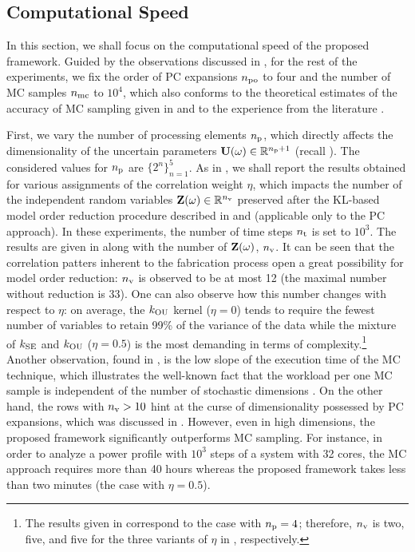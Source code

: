 \subsection{Computational Speed}

In this section, we shall focus on the computational speed of the proposed framework.
Guided by the observations discussed in , for the rest of the experiments, we fix the order of PC expansions ${n_\text{po}}$ to four and the number of MC samples ${n_\text{mc}}$ to $10^4$, which also conforms to the theoretical estimates of the accuracy of MC sampling given in \cite{diaz-emparanza2002} and to the experience from the literature \cite{xiu2010, maitre2010, shen2009, eldred2008}.

First, we vary the number of processing elements ${n_\text{p}}$, which directly affects the dimensionality of the uncertain parameters $\mathbf{U}(\omega) \in \mathbb{R}^{{n_\text{p}} + 1}$ (recall ).
The considered values for ${n_\text{p}}$ are $\{ 2^n \}_{n = 1}^5$.
As in , we shall report the results obtained for various assignments of the correlation weight $\eta$, which impacts the number of the independent random variables $\mathbf{Z}(\omega) \in \mathbb{R}^{n_\text{v}}$ preserved after the KL-based model order reduction procedure described in  and  (applicable only to the PC approach).
In these experiments, the number of time steps ${n_\text{t}}$ is set to $10^3$.
The results are given in  along with the number of $\mathbf{Z}(\omega)$, ${n_\text{v}}$.
It can be seen that the correlation patters inherent to the fabrication process \cite{cheng2011} open a great possibility for model order reduction: ${n_\text{v}}$ is observed to be at most 12 (the maximal number without reduction is 33).
One can also observe how this number changes with respect to $\eta$: on average, the $\fCorr_\OU$ kernel ($\eta = 0$) tends to require the fewest number of variables to retain 99\% of the variance of the data while the mixture of $\fCorr_\SE$ and $\fCorr_\OU$ ($\eta = 0.5$) is the most demanding in terms of complexity.\footnote{The results given in  correspond to the case with ${n_\text{p}} = 4$; therefore, ${n_\text{v}}$ is two, five, and five for the three variants of $\eta$ in , respectively.}
Another observation, found in , is the low slope of the execution time of the MC technique, which illustrates the well-known fact that the workload per one MC sample is independent of the number of stochastic dimensions \cite{maitre2010}.
On the other hand, the rows with ${n_\text{v}} > 10$ hint at the curse of dimensionality possessed by PC expansions, which was discussed in .
However, even in high dimensions, the proposed framework significantly outperforms MC sampling. For instance, in order to analyze a power profile with $10^3$ steps of a system with 32 cores, the MC approach requires more than 40 hours whereas the proposed framework takes less than two minutes (the case with $\eta = 0.5$).

